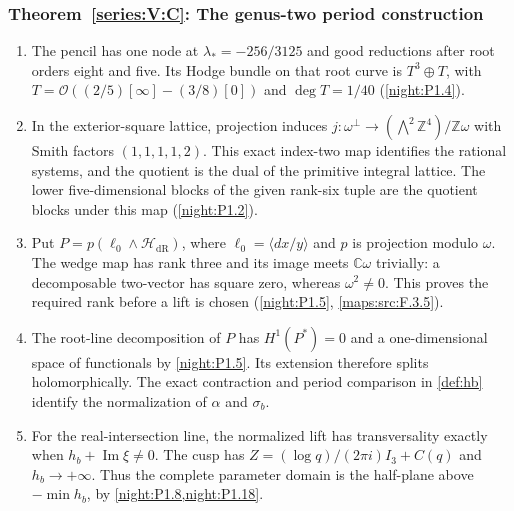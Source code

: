 \documentclass[11pt,a4paper]{article}
\numberwithin{equation}{section}
\theoremstyle{definition}
\begin{document}
\subsubsection*{Theorem~\ref{series:V:C}: The genus-two period construction}
\begin{enumerate}[label=\arabic*.,leftmargin=*]
\item\hypertarget{step-V-C-1}{} The pencil has one node at $\lambda_*=-256/3125$ and good
  reductions after root orders eight and five.  Its Hodge bundle on
  that root curve is $T^3\oplus T$, with
  $T=\mathcal O((2/5)[\infty]-(3/8)[0])$ and
  $\deg T=1/40$ (\cref{night:P1.4}).

\item\hypertarget{step-V-C-2}{} In the exterior-square lattice, projection induces
  $j:\omega^\perp\to(\bigwedge^2\mathbb Z^4)/\mathbb Z\omega$
  with Smith factors $(1,1,1,1,2)$.  This exact index-two map identifies
  the rational systems, and the quotient is the dual of the primitive
  integral lattice.  The lower five-dimensional blocks of the given
  rank-six tuple are the quotient blocks under this map
  (\cref{night:P1.2}).

\item\hypertarget{step-V-C-3}{} Put $P=p(\ell_0\wedge\mathcal H_{\mathrm{dR}})$, where
  $\ell_0=\langle dx/y\rangle$ and $p$ is projection modulo $\omega$.
  The wedge map has rank three and its image meets $\mathbb C\omega$
  trivially: a decomposable two-vector has square zero, whereas
  $\omega^2\ne0$.  This proves the required rank before a lift is
  chosen (\cref{night:P1.5}, \cref{maps:src:F.3.5}).

\item\hypertarget{step-V-C-4}{} The root-line decomposition of $P$ has $H^1(P^*)=0$ and a one-dimensional space of functionals by \cref{night:P1.5}. Its extension therefore splits holomorphically. The exact contraction and period comparison in \cref{def:hb} identify the normalization of $\alpha$ and $\sigma_b$.

\item\hypertarget{step-V-C-5}{} For the real-intersection line, the normalized lift has transversality exactly when $h_b+\operatorname{Im}\xi\ne0$. The cusp has $Z=(\log q)/(2\pi i)I_3+C(q)$ and $h_b\to+\infty$. Thus the complete parameter domain is the half-plane above $-\min h_b$, by \cref{night:P1.8,night:P1.18}.

\end{enumerate}

\hypertarget{outline-V-B}{}
\end{document}
